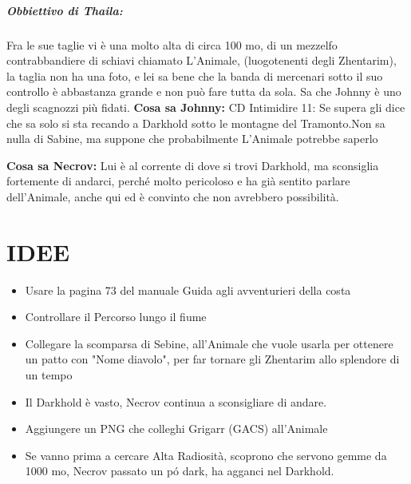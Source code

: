 \documentclass{article}
\begin{document}
           
            
            \subparagraph{Obbiettivo di Thaila: } Fra le sue taglie vi è una molto alta di circa 100 mo, di un mezzelfo contrabbandiere di schiavi chiamato L'Animale, (luogotenenti degli Zhentarim), la taglia non ha una foto, e lei sa bene che la banda di mercenari sotto il suo controllo è abbastanza grande e non può fare tutta da sola. Sa che Johnny è uno degli scagnozzi più fidati. 
                \textbf{Cosa sa Johnny: } CD Intimidire 11: Se supera gli dice che sa solo si sta recando a Darkhold sotto le montagne del Tramonto.Non sa nulla di Sabine, ma suppone che probabilmente L'Animale potrebbe saperlo

                \textbf{Cosa sa Necrov: } Lui è al corrente di dove si trovi Darkhold, ma sconsiglia fortemente di andarci, perché molto pericoloso e ha già sentito parlare dell'Animale, anche qui ed è convinto che non avrebbero possibilità. 




        \section{IDEE}
            \begin{itemize}
                \item Usare la pagina 73 del manuale Guida agli avventurieri della costa
                \item Controllare il Percorso lungo il fiume
                \item Collegare la scomparsa di Sebine, all'Animale che vuole usarla per ottenere un patto con "Nome diavolo", per far tornare  gli Zhentarim allo splendore di un tempo
                \item Il Darkhold è vasto, Necrov continua a sconsigliare di andare.
                \item Aggiungere un PNG che colleghi Grigarr (GACS) all'Animale
                \item Se vanno prima a cercare Alta Radiosità, scoprono che servono gemme da 1000 mo, Necrov passato un pó dark, ha agganci nel Darkhold.  
            \end{itemize}
\end{document}
